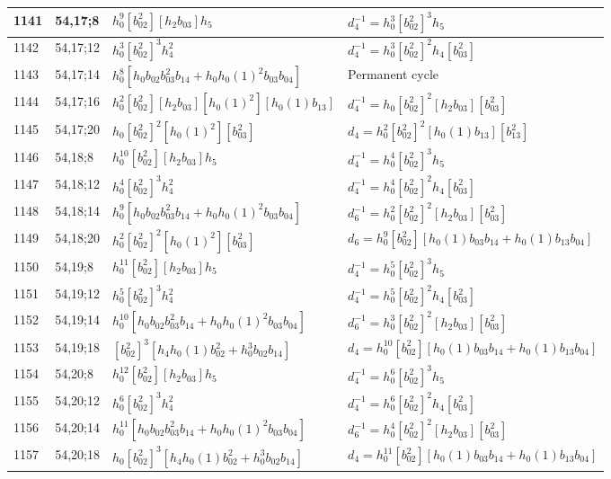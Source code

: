 \documentclass{article}
\begin{document}
\begin{longtable}{|l|l|>{\raggedright\arraybackslash}p{6cm}|>{\raggedright\arraybackslash}p{6cm}|}
\hline
1141 & 54,17;8 & $h_0^9[b_{02}^2][h_2b_{03}]h_5$ & $d_{4}^{-1}=h_0^3[b_{02}^2]^3h_5$\\
\hline
1142 & 54,17;12 & $h_0^3[b_{02}^2]^3h_4^2$ & $d_{4}^{-1}=h_0^3[b_{02}^2]^2h_4[b_{03}^2]$\\
\hline
1143 & 54,17;14 & $h_0^8[h_0b_{02}b_{03}^2b_{14} + h_0h_0(1)^2b_{03}b_{04}]$ & Permanent cycle\\
\hline
1144 & 54,17;16 & $h_0^2[b_{02}^2][h_2b_{03}][h_0(1)^2][h_0(1)b_{13}]$ & $d_{4}^{-1}=h_0[b_{02}^2]^2[h_2b_{03}][b_{03}^2]$\\
\hline
1145 & 54,17;20 & $h_0[b_{02}^2]^2[h_0(1)^2][b_{03}^2]$ &$d_{4}=h_0^2[b_{02}^2]^2[h_0(1)b_{13}][b_{13}^2]$\\
\hline
1146 & 54,18;8 & $h_0^{10}[b_{02}^2][h_2b_{03}]h_5$ & $d_{4}^{-1}=h_0^4[b_{02}^2]^3h_5$\\
\hline
1147 & 54,18;12 & $h_0^4[b_{02}^2]^3h_4^2$ & $d_{4}^{-1}=h_0^4[b_{02}^2]^2h_4[b_{03}^2]$\\
\hline
1148 & 54,18;14 & $h_0^9[h_0b_{02}b_{03}^2b_{14} + h_0h_0(1)^2b_{03}b_{04}]$ & $d_{6}^{-1}=h_0^2[b_{02}^2]^2[h_2b_{03}][b_{03}^2]$\\
\hline
1149 & 54,18;20 & $h_0^2[b_{02}^2]^2[h_0(1)^2][b_{03}^2]$ &$d_{6}=h_0^9[b_{02}^2][h_0(1)b_{03}b_{14} + h_0(1)b_{13}b_{04}]$\\
\hline
1150 & 54,19;8 & $h_0^{11}[b_{02}^2][h_2b_{03}]h_5$ & $d_{4}^{-1}=h_0^5[b_{02}^2]^3h_5$\\
\hline
1151 & 54,19;12 & $h_0^5[b_{02}^2]^3h_4^2$ & $d_{4}^{-1}=h_0^5[b_{02}^2]^2h_4[b_{03}^2]$\\
\hline
1152 & 54,19;14 & $h_0^{10}[h_0b_{02}b_{03}^2b_{14} + h_0h_0(1)^2b_{03}b_{04}]$ & $d_{6}^{-1}=h_0^3[b_{02}^2]^2[h_2b_{03}][b_{03}^2]$\\
\hline
1153 & 54,19;18 & $[b_{02}^2]^3[h_4h_0(1)b_{02}^2 + h_0^3b_{02}b_{14}]$ &$d_{4}=h_0^{10}[b_{02}^2][h_0(1)b_{03}b_{14} + h_0(1)b_{13}b_{04}]$\\
\hline
1154 & 54,20;8 & $h_0^{12}[b_{02}^2][h_2b_{03}]h_5$ & $d_{4}^{-1}=h_0^6[b_{02}^2]^3h_5$\\
\hline
1155 & 54,20;12 & $h_0^6[b_{02}^2]^3h_4^2$ & $d_{4}^{-1}=h_0^6[b_{02}^2]^2h_4[b_{03}^2]$\\
\hline
1156 & 54,20;14 & $h_0^{11}[h_0b_{02}b_{03}^2b_{14} + h_0h_0(1)^2b_{03}b_{04}]$ & $d_{6}^{-1}=h_0^4[b_{02}^2]^2[h_2b_{03}][b_{03}^2]$\\
\hline
1157 & 54,20;18 & $h_0[b_{02}^2]^3[h_4h_0(1)b_{02}^2 + h_0^3b_{02}b_{14}]$ &$d_{4}=h_0^{11}[b_{02}^2][h_0(1)b_{03}b_{14} + h_0(1)b_{13}b_{04}]$\\

\end{longtable}
\end{document}
